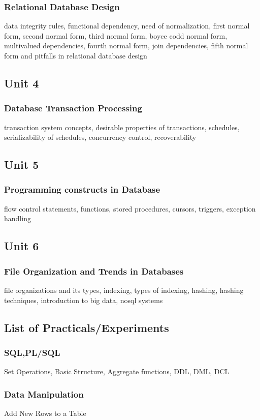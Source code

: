 \documentclass[twocolumn]{article}
\begin{document}
    \subsubsection*{Relational Database Design}
    data integrity rules, functional dependency, need of normalization, first normal form, second normal form, third normal form, boyce codd normal form, multivalued dependencies, fourth normal form, join dependencies, fifth normal form and pitfalls in relational database design
    \subsection*{Unit 4}
    \subsubsection*{Database Transaction Processing}
    transaction system concepts, desirable properties of transactions, schedules, serializability of schedules, concurrency control, recoverability
    \subsection*{Unit 5}
    \subsubsection*{Programming constructs in Database}
    flow control statements, functions, stored procedures, cursors, triggers, exception handling
    \subsection*{Unit 6}
    \subsubsection*{File Organization and Trends in Databases}
    file organizations and its types, indexing, types of indexing, hashing, hashing techniques, introduction to big data, nosql systems
    \subsection*{List of Practicals/Experiments}
    \subsubsection*{SQL,PL/SQL}
    Set Operations, Basic Structure, Aggregate functions, DDL, DML, DCL
    \subsubsection*{Data Manipulation}
    Add New Rows to a Table
\end{document}
